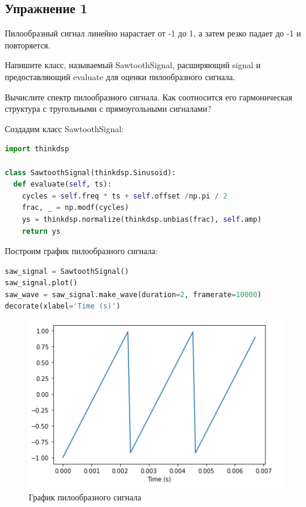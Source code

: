 \subsection{Упражнение 1}

Пилообразный сигнал линейно нарастает от -1 до 1, а затем резко падает до -1 и повторяется.

\noindent Напишите класс, называемый SawtoothSignal, расширяющий signal и предоставляющий evaluate для оценки пилообразного сигнала.

\noindent Вычислите спектр пилообразного сигнала. Как соотносится его гармоническая структура с тругольными с прямоугольными сигналами?

Создадим класс SawtoothSignal:

\begin{lstlisting}[language=Python]
import thinkdsp

class SawtoothSignal(thinkdsp.Sinusoid):
  def evaluate(self, ts):
    cycles = self.freq * ts + self.offset /np.pi / 2
    frac, _ = np.modf(cycles)
    ys = thinkdsp.normalize(thinkdsp.unbias(frac), self.amp)
    return ys
\end{lstlisting}

Построим график пилообразного сигнала:

\begin{lstlisting}[language=Python]
saw_signal = SawtoothSignal()
saw_signal.plot()
saw_wave = saw_signal.make_wave(duration=2, framerate=10000)
decorate(xlabel='Time (s)')
\end{lstlisting}

\begin{figure}[H]
	\begin{center}
		\includegraphics[scale=1]{fig/lab02/lab02_01.png}
		\caption{График пилообразного сигнала}
	\end{center}
\end{figure}

